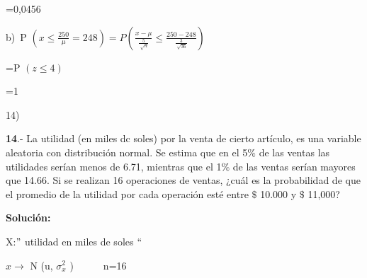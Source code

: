 \documentclass[10pt,a4paper]{article}
\begin{document}
\begin{flushleft}
\begin{justify}
	\begin{justify}
		=0,0456
	\end{justify}\par
	
	
	\vspace{\baselineskip}\begin{justify}
		b)\  P \(  \left( x \leq \frac{250}{ \mu }=248 \right) =P \left( \frac{x- \mu }{\frac{5}{\sqrt[]{n}}} \leq \frac{250-248}{\frac{3}{\sqrt[]{36}}} \right)  \) 
	\end{justify}\par
	
	\begin{adjustwidth}{1.67in}{0.0in}
		\begin{justify}
			=P \(  \left( z \leq 4 \right)  \) 
		\end{justify}\par
		
	\end{adjustwidth}
	
	\begin{adjustwidth}{1.67in}{0.0in}
		\begin{justify}
			=1
		\end{justify}\par
		
	\end{adjustwidth}

14) \vspace{\baselineskip}\begin{justify}
	\textbf{14}.- La utilidad (en miles dc soles) por la venta de cierto artículo, es una variable aleatoria con distribución normal. Se estima que en el 5$\%$  de las ventas las utilidades serían menos de 6.71, mientras que el 1$\%$  de las ventas serían mayores que 14.66. Si se realizan 16 operaciones de ventas, ¿cuál es la probabilidad de que el promedio de la utilidad por cada operación esté entre $\$$ 10.000 y $\$$ 11,000?
\end{justify}\par

\textbf{Solución:}\par


\vspace{\baselineskip}\begin{multicols}{2}
	X:$"$  utilidad en miles de soles $``$\par
	
	\( x \rightarrow  \) N (u, \(   \sigma _{x}^{2} \) )\ \ \ \ \ \  n=16\par
	

\end{multicols}
\end{justify}
\end{flushleft}
\end{document}
